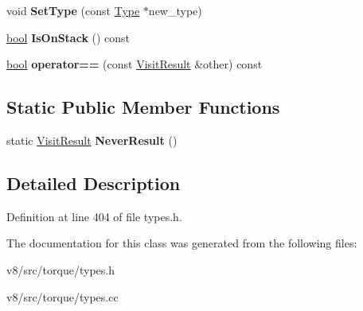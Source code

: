 \begin{DoxyCompactItemize}
\item 
\mbox{\label{classv8_1_1internal_1_1torque_1_1VisitResult_aef697ce0a0404c5513da766c490065b6}} 
void {\bfseries Set\+Type} (const \mbox{\hyperlink{classv8_1_1internal_1_1torque_1_1Type}{Type}} $\ast$new\+\_\+type)
\item 
\mbox{\label{classv8_1_1internal_1_1torque_1_1VisitResult_a8adc99e73c2d2cde0b0a62f9b150244d}} 
\mbox{\hyperlink{classbool}{bool}} {\bfseries Is\+On\+Stack} () const
\item 
\mbox{\label{classv8_1_1internal_1_1torque_1_1VisitResult_a3d8648492f4b59f542ab2fcf2a350165}} 
\mbox{\hyperlink{classbool}{bool}} {\bfseries operator==} (const \mbox{\hyperlink{classv8_1_1internal_1_1torque_1_1VisitResult}{Visit\+Result}} \&other) const
\end{DoxyCompactItemize}
\subsection*{Static Public Member Functions}
\begin{DoxyCompactItemize}
\item 
\mbox{\label{classv8_1_1internal_1_1torque_1_1VisitResult_a1bbe1ba249977a11c7b3666071ffe68b}} 
static \mbox{\hyperlink{classv8_1_1internal_1_1torque_1_1VisitResult}{Visit\+Result}} {\bfseries Never\+Result} ()
\end{DoxyCompactItemize}


\subsection{Detailed Description}


Definition at line 404 of file types.\+h.



The documentation for this class was generated from the following files\+:\begin{DoxyCompactItemize}
\item 
v8/src/torque/types.\+h\item 
v8/src/torque/types.\+cc\end{DoxyCompactItemize}
